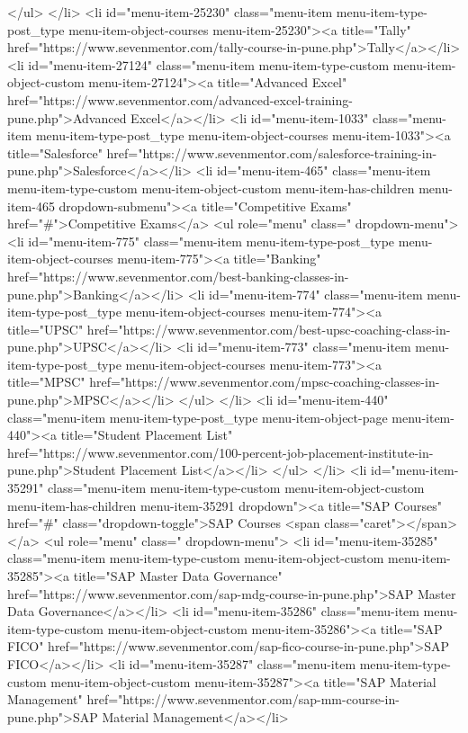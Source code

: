 {</ul>
</li>
<li id="menu-item-25230" class="menu-item menu-item-type-post_type menu-item-object-courses menu-item-25230"><a title="Tally" href="https://www.sevenmentor.com/tally-course-in-pune.php">Tally</a></li>
<li id="menu-item-27124" class="menu-item menu-item-type-custom menu-item-object-custom menu-item-27124"><a title="Advanced Excel" href="https://www.sevenmentor.com/advanced-excel-training-pune.php">Advanced Excel</a></li>
<li id="menu-item-1033" class="menu-item menu-item-type-post_type menu-item-object-courses menu-item-1033"><a title="Salesforce" href="https://www.sevenmentor.com/salesforce-training-in-pune.php">Salesforce</a></li>
<li id="menu-item-465" class="menu-item menu-item-type-custom menu-item-object-custom menu-item-has-children menu-item-465 dropdown-submenu"><a title="Competitive Exams" href="#">Competitive Exams</a>
<ul role="menu" class=" dropdown-menu">
<li id="menu-item-775" class="menu-item menu-item-type-post_type menu-item-object-courses menu-item-775"><a title="Banking" href="https://www.sevenmentor.com/best-banking-classes-in-pune.php">Banking</a></li>
<li id="menu-item-774" class="menu-item menu-item-type-post_type menu-item-object-courses menu-item-774"><a title="UPSC" href="https://www.sevenmentor.com/best-upsc-coaching-class-in-pune.php">UPSC</a></li>
<li id="menu-item-773" class="menu-item menu-item-type-post_type menu-item-object-courses menu-item-773"><a title="MPSC" href="https://www.sevenmentor.com/mpsc-coaching-classes-in-pune.php">MPSC</a></li>
</ul>
</li>
<li id="menu-item-440" class="menu-item menu-item-type-post_type menu-item-object-page menu-item-440"><a title="Student Placement List" href="https://www.sevenmentor.com/100-percent-job-placement-institute-in-pune.php">Student Placement List</a></li>
</ul>
</li>
<li id="menu-item-35291" class="menu-item menu-item-type-custom menu-item-object-custom menu-item-has-children menu-item-35291 dropdown"><a title="SAP Courses" href="#" class="dropdown-toggle">SAP Courses <span class="caret"></span></a>
<ul role="menu" class=" dropdown-menu">
<li id="menu-item-35285" class="menu-item menu-item-type-custom menu-item-object-custom menu-item-35285"><a title="SAP Master Data Governance" href="https://www.sevenmentor.com/sap-mdg-course-in-pune.php">SAP Master Data Governance</a></li>
<li id="menu-item-35286" class="menu-item menu-item-type-custom menu-item-object-custom menu-item-35286"><a title="SAP FICO" href="https://www.sevenmentor.com/sap-fico-course-in-pune.php">SAP FICO</a></li>
<li id="menu-item-35287" class="menu-item menu-item-type-custom menu-item-object-custom menu-item-35287"><a title="SAP Material Management" href="https://www.sevenmentor.com/sap-mm-course-in-pune.php">SAP Material Management</a></li>
}
